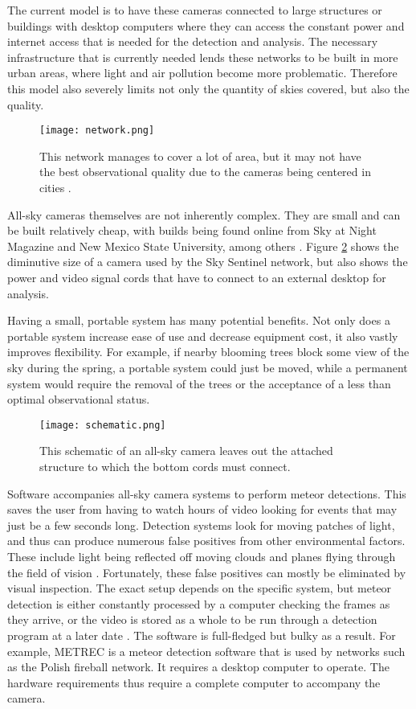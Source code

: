 The current model is to have these cameras connected to large structures or buildings with desktop computers where they can access the constant power and internet access that is needed for the detection and analysis. The necessary infrastructure that is currently needed lends these networks to be built in more urban areas, where light and air pollution become more problematic. Therefore this  model also severely limits not only the quantity of skies covered, but also the quality.

\begin{figure}[ht!]
	\centering
	\texttt{[image: network.png]}
	\caption{This network manages to cover a lot of area, but it may not have the best observational quality due to the cameras being centered in cities \protect\cite{SkySentinel}.}
	\label{fig:network}
\end{figure}

All-sky cameras themselves are not inherently complex. They are small and can be built relatively cheap, with builds being found online from Sky at Night Magazine and New Mexico State University, among others \cite{Bannister2012}. Figure \ref{fig:schematic} shows the diminutive size of a camera used by the Sky Sentinel network, but also shows the power and video signal cords that have to connect to an external desktop for analysis. 

Having a small, portable system has many potential benefits. Not only does a portable system increase ease of use and decrease equipment cost, it also vastly improves flexibility. For example, if nearby blooming trees block some view of the sky during the spring, a portable system could just be moved, while a permanent system would require the removal of the trees or the acceptance of a less than optimal observational status.

\begin{figure}[ht!]
	\centering
	\texttt{[image: schematic.png]}
	\caption{This schematic of an all-sky camera leaves out the attached structure to which the bottom cords must connect\protect\cite{Bannister2012}.}
	\label{fig:schematic}
\end{figure}

Software accompanies all-sky camera systems to perform meteor detections. This saves the user from having to watch hours of video looking for events that may just be a few seconds long. Detection systems look for moving patches of light, and thus can produce numerous false positives from other environmental factors. These include light being reflected off moving clouds and planes flying through the field of vision \cite{Harbaugh2008}. Fortunately, these false positives can mostly be eliminated by visual inspection. The exact setup depends on the specific system, but meteor detection is either constantly processed by a computer checking the frames as they arrive, or the video is stored as a whole to be run through a detection program at a later date \cite{Molau2005}. The software is full-fledged but bulky as a result. For example, METREC is a meteor detection software that is used by networks such as the Polish fireball network. It requires a desktop computer to operate\cite{Molau2005}. The hardware requirements thus require a complete computer to accompany the camera.  

